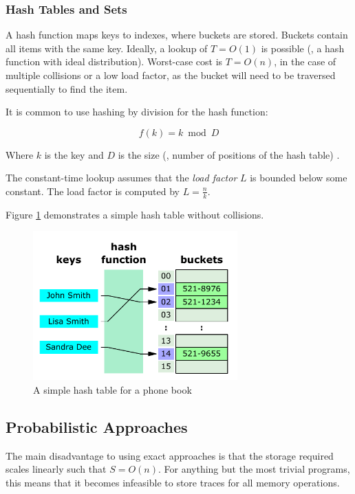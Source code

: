 		\subsubsection{Hash Tables and Sets} \label{sec:runtime/storage/exact/hashing}
		A hash function maps keys to indexes, where buckets are stored. Buckets contain all items with the same key. Ideally, a lookup of $T=O(1)$ is possible (\ie, a hash function with ideal distribution). Worst-case cost is $T=O(n)$, in the case of multiple collisions or a low load factor, as the bucket will need to be traversed sequentially to find the item.
		
		It is common to use hashing by division for the hash function:
		
		\[
			f(k) = k \bmod{D}
		\]
		
		Where $k$ is the key and $D$ is the size (\ie, number of positions of the hash table) \citep{DSandAlgsCpp}.
		
		The constant-time lookup assumes that the \textit{load factor} $L$ is bounded below some constant. The load factor is computed by $L=\frac{n}{k}$.
		
		Figure \ref{fig:hash-table} demonstrates a simple hash table without collisions.
		
		\begin{figure}
			\centering
			\includegraphics[width=0.7\textwidth]{graphics/hash-table.pdf}
			\caption{A simple hash table for a phone book \citep{HashTableWikiDiagram}}
			\label{fig:hash-table}
		\end{figure}

	\subsection{Probabilistic Approaches} \label{sec:runtime/storage/probabilistic}
	The main disadvantage to using exact approaches is that the storage required scales linearly such that $S=O(n)$. For anything but the most trivial programs, this means that it becomes infeasible to store traces for all memory operations.
	
